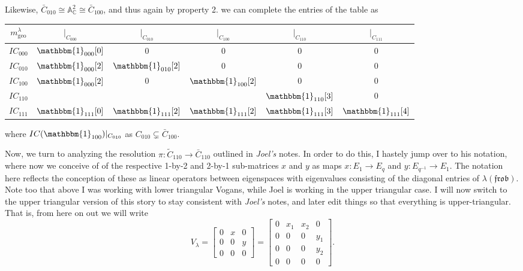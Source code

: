 \documentclass{memoir}
\newcommand{\mf}{\mathfrak}
\newcommand{\ba}{\mathbb{A}}
\newcommand{\bc}{\mathbb{C}}
\newcommand{\tx}{\text}
\theoremstyle{definition}
\begin{document}
	Likewise, $\bar{C}_{010}\cong \ba_{\bc}^2\cong\bar{C}_{100}$, and thus again by property 2. we can complete the entries of the table as 
	\begin{center}
	\begin{tabular}{ c | c c c c c}
		$m_{\tx{geo}}^\lambda$ & $|_{C_{000}}$ & $|_{C_{010}}$ & $|_{C_{100}}$ & $|_{C_{110}}$ & $|_{C_{111}}$ \\
		\hline 
		$IC_{000}$ & $\mathbbm{1}_{000}[0]$ & 0 & 0 & 0 & 0\\
		$IC_{010}$ & $\mathbbm{1}_{000}[2]$ & $\mathbbm{1}_{010}[2]$ & 0 & 0 & 0 \\
		$IC_{100}$ & $\mathbbm{1}_{000}[2]$ & 0 & $\mathbbm{1}_{100}[2]$ & 0 & 0 \\
		$IC_{110}$ &  &  &  & $\mathbbm{1}_{110}[3]$ & 0 \\
		$IC_{111}$ & $\mathbbm{1}_{111}[0]$ & $\mathbbm{1}_{111}[2]$ & $\mathbbm{1}_{111}[2]$ & $\mathbbm{1}_{111}[3]$ & $\mathbbm{1}_{111}[4]$ \\
	\end{tabular}
\end{center}
%
	where $IC(\mathbbm{1}_{100})|_{C_{010}}$ as $C_{010}\subsetneq \bar{C}_{100}$.  
	
	Now, we turn to analyzing the resolution $\pi:\tilde{C}_{110}\to \bar{C}_{110}$ outlined in \emph{Joel's} notes.  
	In order to do this, I hastely jump over to his notation, where now we conceive of of the respective 1-by-2 and 2-by-1 sub-matrices $x$ and $y$ as maps $x:E_1\to E_q$ and $y:E_{q^{-1}}\to E_1$.  
	The notation here reflects the conception of these as linear operators between eigenspaces with eigenvalues consisting of the diagonal entries of $\lambda(\mf{frob})$.  
	Note too that above I was working with lower triangular Vogans, while Joel is working in the upper triangular case. 
	I will now switch to the upper triangular version of this story to stay consistent with \emph{Joel's} notes, and later edit things so that everything is upper-triangular.   
	That is, from here on out we will write
	$$V_\lambda=\begin{bmatrix}
		0 & x & 0 \\
		0 & 0 & y\\
		0 & 0 & 0
	\end{bmatrix}=\begin{bmatrix}
	0 & x_1 & x_2 & 0 \\
	0 & 0 & 0 & y_1 \\
	0 & 0 & 0 & y_2 \\
	0 & 0 & 0 & 0
\end{bmatrix}.$$
\end{document}
